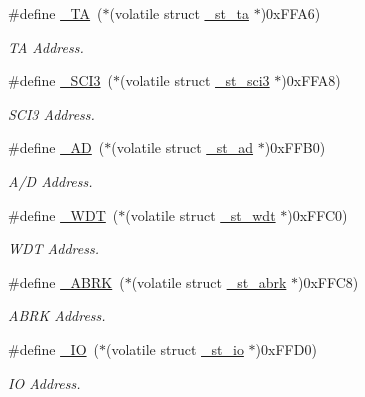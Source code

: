 \begin{DoxyCompactItemize}
\#define \hyperlink{3694s_8h_a939a2391f69f646cdec38c24f3e8a18b_a939a2391f69f646cdec38c24f3e8a18b}{\+\_\+\+T\+A}~($\ast$(volatile struct \hyperlink{3694s_8h_d3/d65/struct__st__ta}{\+\_\+st\+\_\+ta}    $\ast$)0x\+F\+F\+A6)
\begin{DoxyCompactList}\small\item\em T\+A Address. \end{DoxyCompactList}\item 
\#define \hyperlink{3694s_8h_a0c04ae9a6046afaa267361219131972b_a0c04ae9a6046afaa267361219131972b}{\+\_\+\+S\+C\+I3}~($\ast$(volatile struct \hyperlink{3694s_8h_d7/d0b/struct__st__sci3}{\+\_\+st\+\_\+sci3}  $\ast$)0x\+F\+F\+A8)
\begin{DoxyCompactList}\small\item\em S\+C\+I3 Address. \end{DoxyCompactList}\item 
\#define \hyperlink{3694s_8h_a38dccac05b70940cc39e5a5b20badfce_a38dccac05b70940cc39e5a5b20badfce}{\+\_\+\+A\+D}~($\ast$(volatile struct \hyperlink{3694s_8h_d5/d81/struct__st__ad}{\+\_\+st\+\_\+ad}    $\ast$)0x\+F\+F\+B0)
\begin{DoxyCompactList}\small\item\em A/\+D Address. \end{DoxyCompactList}\item 
\#define \hyperlink{3694s_8h_a6db50fd1998eb4ff09c85f8493fedad0_a6db50fd1998eb4ff09c85f8493fedad0}{\+\_\+\+W\+D\+T}~($\ast$(volatile struct \hyperlink{3694s_8h_df/dd0/struct__st__wdt}{\+\_\+st\+\_\+wdt}   $\ast$)0x\+F\+F\+C0)
\begin{DoxyCompactList}\small\item\em W\+D\+T Address. \end{DoxyCompactList}\item 
\#define \hyperlink{3694s_8h_a6a781f449aab73ea1a155a003e25df71_a6a781f449aab73ea1a155a003e25df71}{\+\_\+\+A\+B\+R\+K}~($\ast$(volatile struct \hyperlink{3694s_8h_d2/d0a/struct__st__abrk}{\+\_\+st\+\_\+abrk}  $\ast$)0x\+F\+F\+C8)
\begin{DoxyCompactList}\small\item\em A\+B\+R\+K Address. \end{DoxyCompactList}\item 
\#define \hyperlink{3694s_8h_a481f1b6501d20c1a3d4b6f209953960f_a481f1b6501d20c1a3d4b6f209953960f}{\+\_\+\+I\+O}~($\ast$(volatile struct \hyperlink{3694s_8h_d1/df1/struct__st__io}{\+\_\+st\+\_\+io}    $\ast$)0x\+F\+F\+D0)
\begin{DoxyCompactList}\small\item\em I\+O Address. \end{DoxyCompactList}\item 

\end{DoxyCompactItemize}
